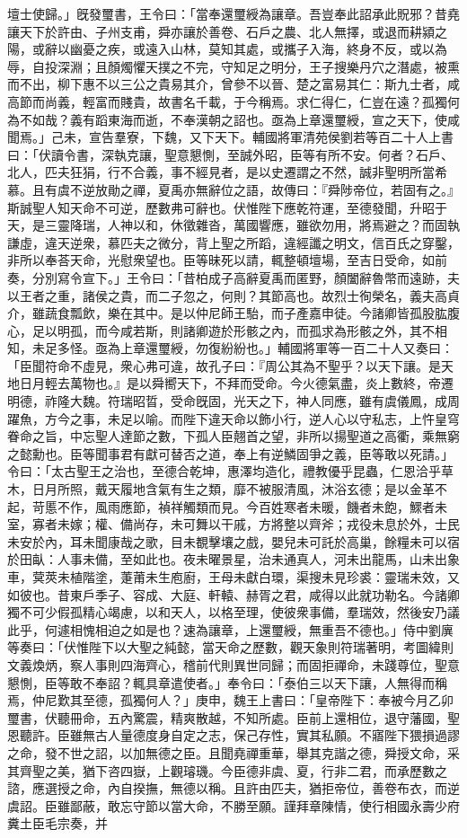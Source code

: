 \begin{pinyinscope}
壇士使歸。」旣發璽書，王令曰：「當奉還璽綬為讓章。吾豈奉此詔承此貺邪？昔堯讓天下於許由、子州支甫，舜亦讓於善卷、石戶之農、北人無擇，或退而耕潁之陽，或辭以幽憂之疾，或遠入山林，莫知其處，或攜子入海，終身不反，或以為辱，自投深淵；且顏燭懼天撲之不完，守知足之明分，王子搜樂丹穴之潛處，被熏而不出，柳下惠不以三公之貴易其介，曾參不以晉、楚之富易其仁：斯九士者，咸高節而尚義，輕富而賤貴，故書名千載，于今稱焉。求仁得仁，仁豈在遠？孤獨何為不如哉？義有蹈東海而逝，不奉漢朝之詔也。亟為上章還璽綬，宣之天下，使咸聞焉。」己未，宣告羣寮，下魏，又下天下。輔國將軍清苑侯劉若等百二十人上書曰：「伏讀令書，深執克讓，聖意懇惻，至誠外昭，臣等有所不安。何者？石戶、北人，匹夫狂狷，行不合義，事不經見者，是以史遷謂之不然，誠非聖明所當希慕。且有虞不逆放勛之禪，夏禹亦無辭位之語，故傳曰：『舜陟帝位，若固有之。』斯誠聖人知天命不可逆，歷數弗可辭也。伏惟陛下應乾符運，至德發聞，升昭于天，是三靈降瑞，人神以和，休徵雜沓，萬國響應，雖欲勿用，將焉避之？而固執謙虛，違天逆衆，慕匹夫之微分，背上聖之所蹈，違經讖之明文，信百氏之穿鑿，非所以奉荅天命，光慰衆望也。臣等昧死以請，輒整頓壇場，至吉日受命，如前奏，分別寫令宣下。」王令曰：「昔柏成子高辭夏禹而匿野，顏闔辭魯幣而遠跡，夫以王者之重，諸侯之貴，而二子忽之，何則？其節高也。故烈士徇榮名，義夫高貞介，雖蔬食瓢飲，樂在其中。是以仲尼師王駘，而子產嘉申徒。今諸卿皆孤股肱腹心，足以明孤，而今咸若斯，則諸卿遊於形骸之內，而孤求為形骸之外，其不相知，未足多怪。亟為上章還璽綬，勿復紛紛也。」輔國將軍等一百二十人又奏曰：「臣聞符命不虛見，衆心弗可違，故孔子曰：『周公其為不聖乎？以天下讓。是天地日月輕去萬物也。』是以舜嚮天下，不拜而受命。今火德氣盡，炎上數終，帝遷明德，祚隆大魏。符瑞昭晢，受命旣固，光天之下，神人同應，雖有虞儀鳳，成周躍魚，方今之事，未足以喻。而陛下違天命以飾小行，逆人心以守私志，上忤皇穹眷命之旨，中忘聖人達節之數，下孤人臣翹首之望，非所以揚聖道之高衢，乘無窮之懿勳也。臣等聞事君有獻可替否之道，奉上有逆鱗固爭之義，臣等敢以死請。」令曰：「太古聖王之治也，至德合乾坤，惠澤均造化，禮教優乎昆蟲，仁恩洽乎草木，日月所照，戴天履地含氣有生之類，靡不被服清風，沐浴玄德；是以金革不起，苛慝不作，風雨應節，禎祥觸類而見。今百姓寒者未暖，饑者未飽，鰥者未室，寡者未嫁；權、備尚存，未可舞以干戚，方將整以齊斧；戎役未息於外，士民未安於內，耳未聞康哉之歌，目未覩擊壤之戲，嬰兒未可託於高巢，餘糧未可以宿於田畒：人事未備，至如此也。夜未曜景星，治未通真人，河未出龍馬，山未出象車，蓂莢未植階塗，萐莆未生庖廚，王母未獻白環，渠搜未見珍裘：靈瑞未效，又如彼也。昔東戶季子、容成、大庭、軒轅、赫胥之君，咸得以此就功勒名。今諸卿獨不可少假孤精心竭慮，以和天人，以格至理，使彼衆事備，羣瑞效，然後安乃議此乎，何遽相愧相迫之如是也？速為讓章，上還璽綬，無重吾不德也。」侍中劉廙等奏曰：「伏惟陛下以大聖之純懿，當天命之歷數，觀天象則符瑞著明，考圖緯則文義煥炳，察人事則四海齊心，稽前代則異世同歸；而固拒禪命，未踐尊位，聖意懇惻，臣等敢不奉詔？輒具章遣使者。」奉令曰：「泰伯三以天下讓，人無得而稱焉，仲尼歎其至德，孤獨何人？」庚申，魏王上書曰：「皇帝陛下：奉被今月乙卯璽書，伏聽冊命，五內驚震，精爽散越，不知所處。臣前上還相位，退守藩國，聖恩聽許。臣雖無古人量德度身自定之志，保己存性，實其私願。不寤陛下猥損過謬之命，發不世之詔，以加無德之臣。且聞堯禪重華，舉其克諧之德，舜授文命，采其齊聖之美，猶下咨四嶽，上觀璿璣。今臣德非虞、夏，行非二君，而承歷數之諮，應選授之命，內自揆撫，無德以稱。且許由匹夫，猶拒帝位，善卷布衣，而逆虞詔。臣雖鄙蔽，敢忘守節以當大命，不勝至願。謹拜章陳情，使行相國永壽少府糞土臣毛宗奏，并
\end{pinyinscope}
